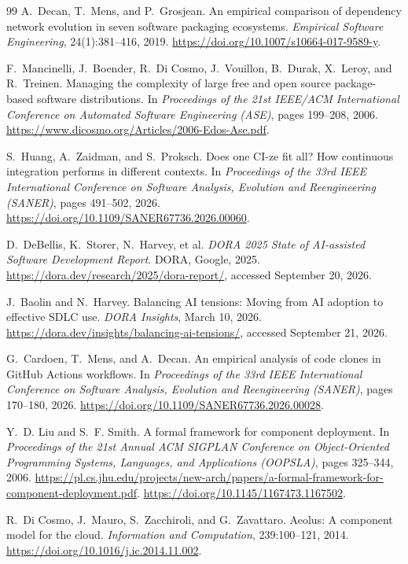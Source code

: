 \begin{thebibliography}{99}
A.~Decan, T.~Mens, and P.~Grosjean.
An empirical comparison of dependency network evolution in seven
software packaging ecosystems.
\emph{Empirical Software Engineering}, 24(1):381--416, 2019.
\url{https://doi.org/10.1007/s10664-017-9589-y}.

F.~Mancinelli, J.~Boender, R.~Di Cosmo, J.~Vouillon, B.~Durak,
X.~Leroy, and R.~Treinen.
Managing the complexity of large free and open source package-based
software distributions.
In \emph{Proceedings of the 21st IEEE/ACM International Conference on
Automated Software Engineering (ASE)}, pages 199--208, 2006.
\url{https://www.dicosmo.org/Articles/2006-Edos-Ase.pdf}.

S.~Huang, A.~Zaidman, and S.~Proksch.
Does one CI-ze fit all? How continuous integration performs in different
contexts.
In \emph{Proceedings of the 33rd IEEE International Conference on Software
Analysis, Evolution and Reengineering (SANER)}, pages 491--502, 2026.
\url{https://doi.org/10.1109/SANER67736.2026.00060}.

D.~DeBellis, K.~Storer, N.~Harvey, et al.
\emph{DORA 2025 State of AI-assisted Software Development Report}.
DORA, Google, 2025.
\url{https://dora.dev/research/2025/dora-report/}, accessed September 20, 2026.

J.~Baolin and N.~Harvey.
Balancing AI tensions: Moving from AI adoption to effective SDLC use.
\emph{DORA Insights}, March 10, 2026.
\url{https://dora.dev/insights/balancing-ai-tensions/}, accessed September 21, 2026.

G.~Cardoen, T.~Mens, and A.~Decan.
An empirical analysis of code clones in GitHub Actions workflows.
In \emph{Proceedings of the 33rd IEEE International Conference on Software
Analysis, Evolution and Reengineering (SANER)}, pages 170--180, 2026.
\url{https://doi.org/10.1109/SANER67736.2026.00028}.

Y.~D. Liu and S.~F. Smith.
A formal framework for component deployment.
In \emph{Proceedings of the 21st Annual ACM SIGPLAN Conference on
Object-Oriented Programming Systems, Languages, and Applications (OOPSLA)},
pages 325--344, 2006.
\url{https://pl.cs.jhu.edu/projects/new-arch/papers/a-formal-framework-for-component-deployment.pdf}.
\url{https://doi.org/10.1145/1167473.1167502}.

R.~Di Cosmo, J.~Mauro, S.~Zacchiroli, and G.~Zavattaro.
Aeolus: A component model for the cloud.
\emph{Information and Computation}, 239:100--121, 2014.
\url{https://doi.org/10.1016/j.ic.2014.11.002}.


\end{thebibliography}
